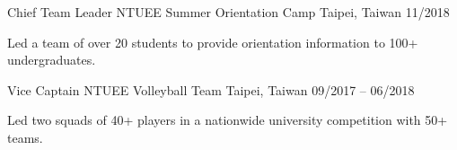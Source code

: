 
\begin{cvhonors}
  \cvhonor
    {Chief Team Leader}
    {NTUEE Summer Orientation Camp}
    {Taipei, Taiwan}
    {}
    {11/2018}
    {
      \vspace{-4.0mm}
      \begin{cvitems}
        \item {Led a team of over 20 students to provide orientation information to 100+ undergraduates.}
      \end{cvitems}
      \vspace{-4.0mm}
    }

  \cvhonor
    {Vice Captain}
    {NTUEE Volleyball Team}
    {Taipei, Taiwan}
    {}
    {09/2017 -- 06/2018}
    {
      \vspace{-4.0mm}
      \begin{cvitems}
        \item {Led two squads of 40+ players in a nationwide university competition with 50+ teams.}
      \end{cvitems}
      \vspace{-4.0mm}
    }
\end{cvhonors}
